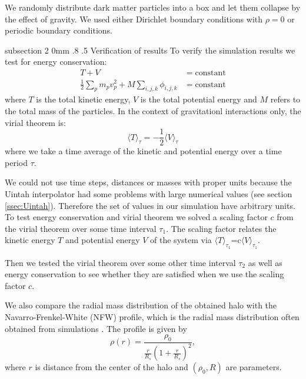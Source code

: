\documentclass[notitlepage, 12pt]{article}
\makeatletter
\renewcommand{\subsection}{\@startsection    %
        {subsection}
        {2}
        {0mm}
        {.8\baselineskip}
        {.5\baselineskip}
        {\bfseries\normalsize}}
\makeatother
\begin{document}
We randomly distribute dark matter particles into a box and let them collapse by the effect of gravity. We used either Dirichlet boundary conditions with $\rho=0$ or periodic boundary conditions.    

\subsection{Verification of results} \label{sec:verification}
To verify the simulation results we test for energy conservation:
\begin{align}
T+V&=\mathrm{constant}\\
\frac{1}{2}\sum_{p} m_pv_p^2 + M\sum_{i,j,k}\phi_{i,j,k} &= \mathrm{constant} 
\end{align}
where $T$ is the total kinetic energy, $V$ is the total potential energy and $M$ refers to the total mass of the particles. In the context of gravitationl interactions only, the virial theorem is:
\begin{equation}
\langle T \rangle_\tau = -\frac{1}{2}\langle V \rangle_\tau
\end{equation}
where we take a time average of the kinetic and potential energy over a time period $\tau$.

We could not use time steps, distances or masses with proper units because the Uintah interpolator had some problems with large numerical values (see section \ref{ssec:Uintah}). Therefore the set of values in our simulation have arbitrary units. To test energy conservation and virial theorem we solved a scaling factor $c$ from the virial theorem over some time interval $\tau_1$. The scaling factor relates the kinetic energy $T$ and potential energy $V$ of the system via $\langle T \rangle_{\tau_1}$=c$\langle V\rangle_{\tau_1}$.

Then we tested the virial theorem over some other time interval $\tau_2$ as well as energy conservation to see whether they are satisfied when we use the scaling factor $c$.  

We also compare the radial mass distribution of the obtained halo with the Navarro-Frenkel-White (NFW) profile, which is the radial mass distribution often obtained from simulations \citep{Navarro1995}. The profile is given by  
\begin{equation}
\rho(r) = \frac{\rho_0}{\frac{r}{R_s}\left(1 + \frac{r}{R_s}\right)^2},
\label{eq:nfw}
\end{equation}
where $r$ is distance from the center of the halo and $(\rho_0,R)$ are parameters.    
\end{document}
